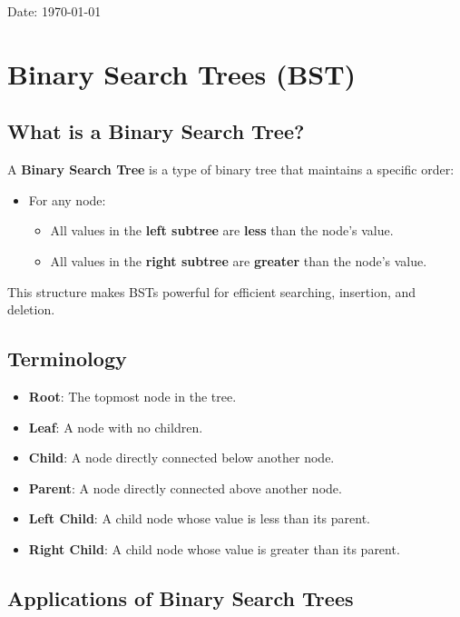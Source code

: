 \documentclass{thesisnotes}
\begin{document}
\begin{tcolorbox}[mytitlebox, title=Binary Search Trees]
  Date: \today
\end{tcolorbox}
\section{Binary Search Trees (BST)}

\subsection{What is a Binary Search Tree?}
A \textbf{Binary Search Tree} is a type of binary tree that maintains a specific order:
\begin{itemize}
    \item For any node:
    \begin{itemize}
        \item All values in the \textbf{left subtree} are \textbf{less} than the node's value.
        \item All values in the \textbf{right subtree} are \textbf{greater} than the node's value.
    \end{itemize}
\end{itemize}
This structure makes BSTs powerful for efficient searching, insertion, and deletion.

\subsection{Terminology}
\begin{itemize}
    \item \textbf{Root}: The topmost node in the tree.
    \item \textbf{Leaf}: A node with no children.
    \item \textbf{Child}: A node directly connected below another node.
    \item \textbf{Parent}: A node directly connected above another node.
    \item \textbf{Left Child}: A child node whose value is less than its parent.
    \item \textbf{Right Child}: A child node whose value is greater than its parent.
\end{itemize}

\subsection{Applications of Binary Search Trees}
\end{document}
